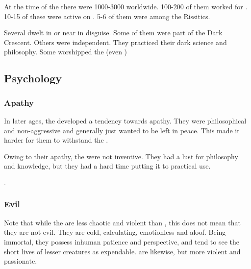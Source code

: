 At the time of the \thirdbanewar there were 1000-3000 \quiljaaran worldwide. 
100-200 of them worked for \Secherdamon.
10-15 of these were active on \Azmith.
5-6 of them were among the Rissitics. 

Several \quiljaaran dwelt in or near \Yormis in disguise. 
Some of them were part of the Dark Crescent.
Others were independent.
They practiced their dark science and philosophy. 
Some worshipped the \xs (even \Ubloth) 









\subsection{Psychology}





\subsubsection{Apathy}
In later ages, the \quiljaaran developed a tendency towards apathy. 
They were philosophical and non-aggressive and generally just wanted to be left in peace. 
This made it harder for them to withstand the . 

Owing to their apathy, the \quiljaaran were not inventive. 
They had a lust for philosophy and knowledge, but they had a hard time putting it to practical use. 

. 





\subsubsection{Evil}
Note that while the \ophidians{} are less chaotic and violent than \dragons, this does not mean that they are not evil. 
They are cold, calculating, emotionless and aloof. 
Being immortal, they possess inhuman patience and perspective, and tend to see the short lives of lesser creatures as expendable. 
\Dragons{} are likewise, but more violent and passionate. 


